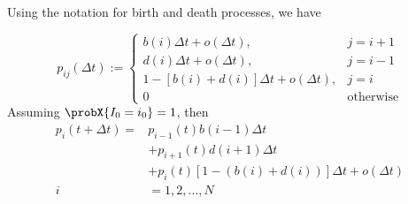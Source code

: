 \documentclass[9pt]{beamer}
\begin{document}
    \begin{frame}{}
        Using the notation for birth and death
        processes, we have

        \begin{equation*}
            p_{ij}(\Delta t):=
                \begin{cases}
                    b(i) \Delta t + o(\Delta t),     
                        & j = i + 1
                    \\
                    d(i) \Delta t + o(\Delta t), 
                        &   j = i - 1
                    \\
                    1 - \left [
                            b(i) + d(i) %
                        \right] \Delta t
                        + o(\Delta t), 
                        & j=i
                    \\
                    0 & \text{otherwise}
                \end{cases}
        \end{equation*}
        Assuming $\probX{I_0 = i_0} = 1$, then
        \begin{align*}
            p_i(t + \Delta t)
                =&
                    p_{i - 1} (t) b(i -1) \Delta t
                    \\
                    & + 
                        p_{i + 1} (t) d(i + 1) \Delta t
                    \\
                    & +
                        p_{i} (t)[1 - (b(i) + d(i))] \Delta t
                    + o(\Delta t)
            \\
            i &= 1, 2, \dots, N
        \end{align*}
    \end{frame}
\end{document}
